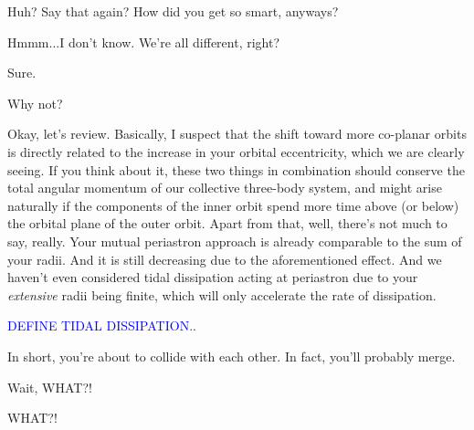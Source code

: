 \documentclass[main.tex]{subfiles}
\begin{document}
\par \Taygete  Huh?  Say that again?  How did you get so smart, anyways?

\par \Celaeno Hmmm...I don't know.  We're all different, right? 

\par \Alcyone Sure.

\par \Taygete Why not?

\par \Celaeno Okay, let's review.  Basically, I suspect that the shift toward more co-planar orbits is directly related to the increase in your orbital eccentricity, which we are clearly seeing.  If you think about it, these two things in combination should conserve the total angular momentum of our collective three-body system, and might arise naturally if the components of the inner orbit spend more time above (or below) the orbital plane of the outer orbit.  Apart from that, well, there's not much to say, really.  Your mutual periastron approach is already comparable to the sum of your radii.  And it is still decreasing due to the aforementioned effect.  And we haven't even considered tidal dissipation acting at periastron due to your \textit{extensive} radii being finite, which will only accelerate the rate of dissipation.

\begin{tcolorbox}[sharp corners, colback=blue!30, colframe=blue!80!blue, title=Torque]
\par \textcolor{blue}{DEFINE TIDAL DISSIPATION.}.  
\end{tcolorbox}

\par \Celaeno In short, you're about to collide with each other.  In fact, you'll probably merge.

\par \Taygete  Wait, WHAT?!

\par \Alcyone  WHAT?!
\end{document}
